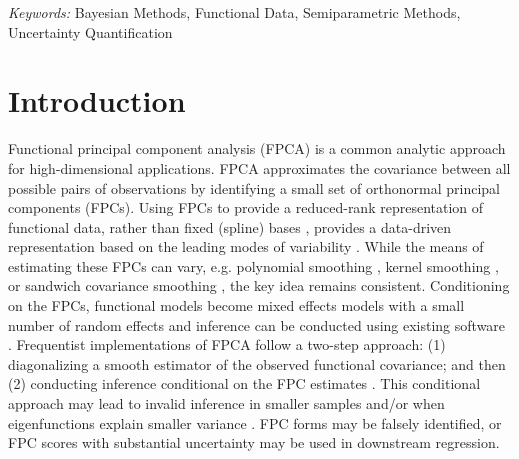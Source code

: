 \documentclass[12pt]{article}
\begin{document}
\noindent%
{\it Keywords:} Bayesian Methods, Functional Data, Semiparametric Methods, Uncertainty Quantification
\vfill

\newpage
{} %

\section{Introduction}\label{subsec:innovation}

Functional principal component analysis (FPCA) is a common analytic approach for high-dimensional applications. FPCA approximates the covariance between all possible pairs of observations by identifying a small set of orthonormal principal components (FPCs). Using FPCs to provide a reduced-rank representation of functional data, rather than fixed (spline) bases \citep{shi_analysis_1996, rice_nonparametric_2001}, provides a data-driven representation based on the leading modes of variability \citep{james_principal_2000}. While the means of estimating these FPCs can vary, e.g. polynomial smoothing \citep{yao_functional_2005}, kernel smoothing \citep{staniswalis_nonparametric_1998}, or sandwich covariance smoothing \citep{xiao_fast_2016}, the key idea remains consistent. Conditioning on the FPCs, functional  models become  mixed effects models with a small number of random effects and inference can be conducted using existing software \citep{reiss_functional_2007, liu_functional_2012,di_multilevel_2009, zhou_reduced_2010, shou_structured_2015}. Frequentist implementations of FPCA follow a two-step approach: (1) diagonalizing a smooth estimator of the observed functional covariance; and then (2) conducting  inference conditional on the FPC estimates \citep{xiao_fast_2016, crainiceanu_bayesian_2010, peng_geometric_2009}. This conditional approach may lead to invalid inference in smaller samples and/or when eigenfunctions explain smaller variance \citep{goldsmith_PCA_2013}. FPC forms may be falsely identified, or FPC scores with substantial uncertainty may be used in downstream regression.
\end{document}
